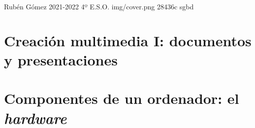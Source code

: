 \documentclass{\ClassPath/yukibook}
\begin{document}
    {Rubén Gómez}  %
    {2021-2022}    %
    {4º E.S.O.} %
    {} %
    {} %
    {img/cover.png} %
    {28436c}
    {sgbd} %

    \coverpage
    \licensepage

    \tableofcontents

    \graphicspath{{img/tic/}}

    \part{Creación multimedia I: \linebreak documentos y presentaciones}

    

    \part{Componentes de un ordenador: el \textit{hardware}}
\end{document}
